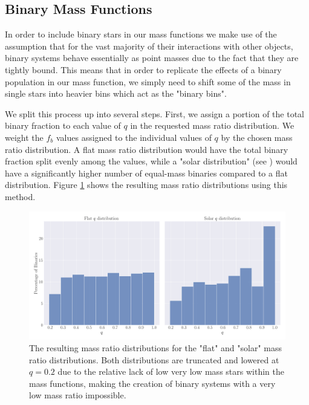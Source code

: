 \subsection{Binary Mass Functions}

In order to include binary stars in our mass functions we make use of the assumption that for the
vast majority of their interactions with other objects, binary systems behave essentially as point
masses due to the fact that they are tightly bound. This means that in order to replicate the
effects of a binary population in our mass function, we simply need to shift some of the mass in
single stars into heavier bins which act as the "binary bins".


We split this process up into several steps. First, we assign a portion of the total binary fraction
to each value of $q$ in the requested mass ratio distribution. We weight the $f_b$ values assigned
to the individual values of $q$ by the chosen mass ratio distribution. A flat mass ratio
distribution would have the total binary fraction split evenly among the values, while a "solar
distribution" (see \citealt{Reggiani2013}) would have a significantly higher number of equal-mass
binaries compared to a flat distribution. Figure \ref{fig:2/q-dists} shows the resulting mass ratio
distributions using this method.





\begin{figure}
    \centering
    \includegraphics[width=\textwidth]{figures/q-dists.png}
    \caption{The resulting mass ratio distributions for the "flat" and "solar" mass ratio
        distributions. Both distributions are truncated and lowered at $q=0.2$ due to the relative
lack of low very low mass stars within the mass functions, making the creation of binary
        systems with a very low mass ratio impossible.}
    \label{fig:2/q-dists}
\end{figure}


